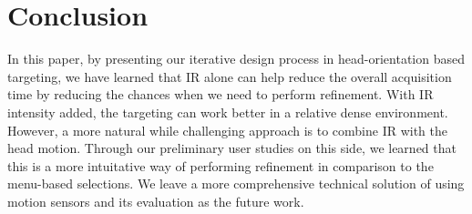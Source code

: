 
\section{Conclusion}
\label{sec:conclusion}

In this paper, by presenting our iterative design process in head-orientation based targeting, we have learned that IR alone can help reduce the overall acquisition time by reducing the chances when we need to perform refinement. With IR intensity added, the targeting can work better in a relative dense environment. However, a more natural while challenging approach is to combine IR with the head motion. Through our preliminary user studies on this side, we learned that this is a more intuitative way of performing refinement in comparison to the menu-based selections. We leave a more comprehensive technical solution of using motion sensors and its evaluation as the future work.

